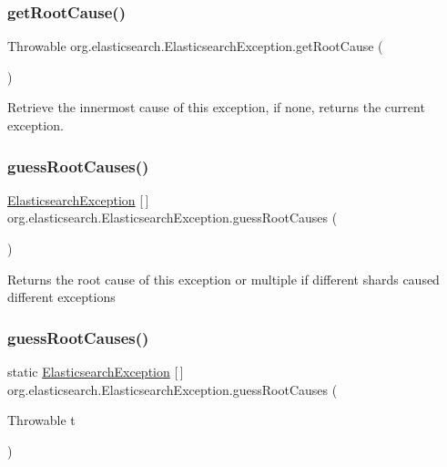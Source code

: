 \subsubsection{\texorpdfstring{get\+Root\+Cause()}{getRootCause()}}
{\footnotesize\ttfamily Throwable org.\+elasticsearch.\+Elasticsearch\+Exception.\+get\+Root\+Cause (\begin{DoxyParamCaption}{ }\end{DoxyParamCaption})}

Retrieve the innermost cause of this exception, if none, returns the current exception. \hypertarget{classorg_1_1elasticsearch_1_1_elasticsearch_exception_aeda2312a330ae7c768410dafe13205e0}{}\label{classorg_1_1elasticsearch_1_1_elasticsearch_exception_aeda2312a330ae7c768410dafe13205e0} 
\subsubsection{\texorpdfstring{guess\+Root\+Causes()}{guessRootCauses()}\hspace{0.1cm}{\footnotesize\ttfamily [1/2]}}
{\footnotesize\ttfamily \hyperlink{classorg_1_1elasticsearch_1_1_elasticsearch_exception}{Elasticsearch\+Exception} \mbox{[}$\,$\mbox{]} org.\+elasticsearch.\+Elasticsearch\+Exception.\+guess\+Root\+Causes (\begin{DoxyParamCaption}{ }\end{DoxyParamCaption})}

Returns the root cause of this exception or multiple if different shards caused different exceptions \hypertarget{classorg_1_1elasticsearch_1_1_elasticsearch_exception_ad110e49bea5a310698f156fec22defcf}{}\label{classorg_1_1elasticsearch_1_1_elasticsearch_exception_ad110e49bea5a310698f156fec22defcf} 
\subsubsection{\texorpdfstring{guess\+Root\+Causes()}{guessRootCauses()}\hspace{0.1cm}{\footnotesize\ttfamily [2/2]}}
{\footnotesize\ttfamily static \hyperlink{classorg_1_1elasticsearch_1_1_elasticsearch_exception}{Elasticsearch\+Exception} \mbox{[}$\,$\mbox{]} org.\+elasticsearch.\+Elasticsearch\+Exception.\+guess\+Root\+Causes (\begin{DoxyParamCaption}\item[{Throwable}]{t }\end{DoxyParamCaption})\hspace{0.3cm}{\ttfamily [static]}}

